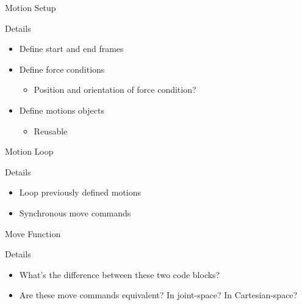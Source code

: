 \documentclass{beamer}
\begin{document}
\begin{frame}{Motion Setup}
  \begin{block}{Details}
    \begin{itemize}
      \item Define start and end frames
      \item Define force conditions
      \begin{itemize}
        \item Position and orientation of force condition?
      \end{itemize}
      \item Define motions objects
      \begin{itemize}
        \item Reusable
      \end{itemize}
    \end{itemize}
  \end{block}
\end{frame}

\begin{frame}{Motion Loop}

  \begin{block}{Details}
    \begin{itemize}
      \item Loop previously defined motions
      \item Synchronous move commands
    \end{itemize}
  \end{block}
\end{frame}

\begin{frame}{Move Function}


  \begin{block}{Details}
    \begin{itemize}
      \item What's the difference between these two code blocks?
      \item Are these move commands equivalent? In joint-space? In Cartesian-space?
    \end{itemize}
  \end{block}
\end{frame}
\end{document}

